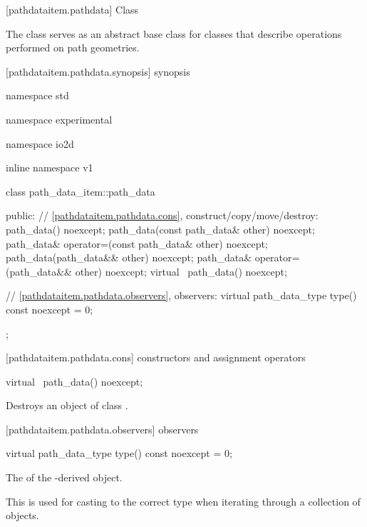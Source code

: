  [pathdataitem.pathdata] {Class }

\pnum
{}
The class  serves as an abstract base class for classes that describe operations performed on path geometries.

 [pathdataitem.pathdata.synopsis] { synopsis}

\begin{codeblock}
namespace std { namespace experimental { namespace io2d { inline namespace v1 {
  class path_data_item::path_data {
  public:
    // \ref{pathdataitem.pathdata.cons}, construct/copy/move/destroy:
    path_data() noexcept;
    path_data(const path_data& other) noexcept;
    path_data& operator=(const path_data& other) noexcept;
    path_data(path_data&& other) noexcept;
    path_data& operator=(path_data&& other) noexcept;
    virtual ~path_data() noexcept;

    // \ref{pathdataitem.pathdata.observers}, observers:
    virtual path_data_type type() const noexcept = 0;
  };
} } } }
\end{codeblock}

 [pathdataitem.pathdata.cons] { constructors and assignment operators}

\begin{itemdecl}
    virtual ~path_data() noexcept;
\end{itemdecl}
\begin{itemdescr}
	\pnum
	\effects
	Destroys an object of class .
\end{itemdescr}

 [pathdataitem.pathdata.observers]{ observers}

\begin{itemdecl}
    virtual path_data_type type() const noexcept = 0;
\end{itemdecl}
\begin{itemdescr}
	\pnum
	\returns
	The  of the -derived object.
	
	\pnum
	\realnote
	This is used for casting to the correct type when iterating through a collection of  objects.
\end{itemdescr}

